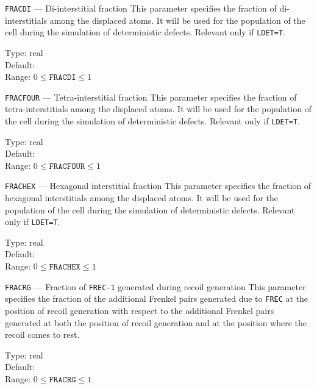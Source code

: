 \ifprivate
\begin{keydescription}{\texttt{FRACDI} --- Di-interstitial fraction}
%
  This parameter specifies the fraction of di-interstitials among the
  displaced atoms. It will be used for the population of the cell during the
  simulation of deterministic defects. Relevant only if
  \texttt{LDET=T}.
  \begin{keytab}
    Type:    \> real \\
    Default:  \\
    Range:   \> $0 \le \texttt{FRACDI} \le 1$
  \end{keytab}
\end{keydescription}

\begin{keydescription}{\texttt{FRACFOUR} --- Tetra-interstitial fraction}
%
  This parameter specifies the fraction of tetra-interstitials among
  the displaced atoms. It will be used for the population of the cell during
  the simulation of deterministic defects. Relevant only if
  \texttt{LDET=T}. 
  \begin{keytab}
    Type:    \> real \\
    Default:  \\
    Range:   \> $0 \le \texttt{FRACFOUR} \le 1$
  \end{keytab}
\end{keydescription}

\begin{keydescription}{\texttt{FRACHEX} --- Hexagonal interstitial fraction}
%
  This parameter specifies the fraction of hexagonal interstitials
  among the displaced atoms. It will be used for the population of the cell
  during the simulation of deterministic defects. Relevant only if
  \texttt{LDET=T}. 
  \begin{keytab}
    Type:    \> real \\
    Default:  \\
    Range:   \> $0 \le \texttt{FRACHEX} \le 1$
  \end{keytab}
\end{keydescription}
\fi

\begin{keydescription}{\texttt{FRACRG} --- Fraction of \texttt{FREC-1}
    generated during recoil generation}
%
  This parameter specifies the fraction of the additional Frenkel pairs
  generated due to \texttt{FREC} at the position of recoil generation
  with respect to the additional Frenkel pairs generated at both the
  position of recoil generation and at the position where the recoil
  comes to rest.
  \begin{keytab}
    Type:    \> real \\
    Default:  \\
    Range:   \> $0 \le \texttt{FRACRG} \le 1$
  \end{keytab}
\end{keydescription}

